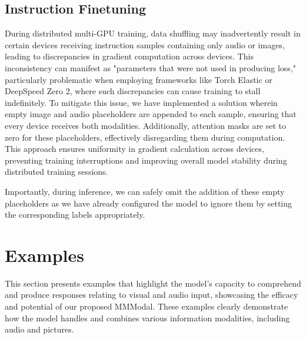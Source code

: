 \documentclass[preprint]{article}
\begin{document}
\subsection{Instruction Finetuning}

During distributed multi-GPU training, data shuffling may inadvertently result in certain devices receiving instruction samples containing only audio or images, leading to discrepancies in gradient computation across devices. This inconsistency can manifest as "parameters that were not used in producing loss," particularly problematic when employing frameworks like Torch Elastic or DeepSpeed Zero 2, where such discrepancies can cause training to stall indefinitely. To mitigate this issue, we have implemented a solution wherein empty image and audio placeholders are appended to each sample, ensuring that every device receives both modalities. Additionally, attention masks are set to zero for these placeholders, effectively disregarding them during computation. This approach ensures uniformity in gradient calculation across devices, preventing training interruptions and improving overall model stability during distributed training sessions.

Importantly, during inference, we can safely omit the addition of these empty placeholders as we have already configured the model to ignore them by setting the corresponding labels appropriately.

\section{Examples}

This section presents examples that highlight the model's capacity to comprehend and produce responses relating to visual and audio input, showcasing the efficacy and potential of our proposed MMModal. These examples clearly demonstrate how the model handles and combines various information modalities, including audio and pictures.
\end{document}
